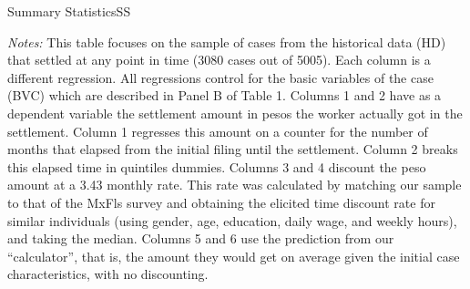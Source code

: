 \documentclass[9pt]{beamer}
\begin{document}
\begin{frame}{Summary Statistics}{SS}
\begin{table}[H]
    \caption{Settlements against duration - Historical Data}
    \label{settlement_time}
    \begin{center}
    \tiny{}
    \end{center}
     \scriptsize
    \textit{Notes:} 
    This table focuses on the sample of cases from the historical data (HD) that settled at any point in time (3080 cases out of 5005). Each column is a different regression. All regressions control for the basic variables of the case (BVC) which are described in Panel B of Table 1. Columns 1 and 2 have as a dependent variable the settlement amount in pesos the worker actually got in the settlement. Column 1 regresses this amount on a counter for the number of months that elapsed from the initial filing until the settlement. Column 2 breaks this elapsed time in quintiles dummies. Columns 3 and 4 discount the peso amount at a 3.43 monthly rate. This rate was calculated by matching our sample to that of the MxFls survey and obtaining the elicited time discount rate for similar individuals (using gender, age, education, daily wage, and weekly hours), and taking the median. Columns 5 and 6 use the prediction from our ``calculator'', that is, the amount they would get on average given the initial case characteristics, with no discounting.
\end{table}
\end{frame}
\end{document}
